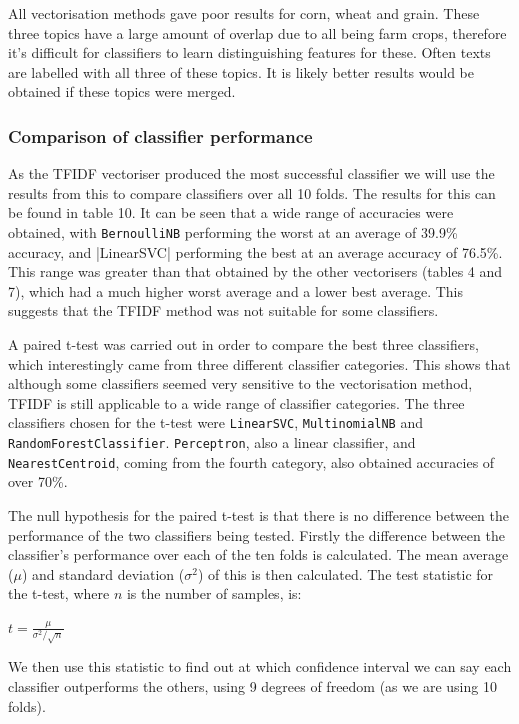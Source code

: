 \documentclass{article}
\begin{document}
All vectorisation methods gave poor results for corn, wheat and grain. These three topics have a large amount of overlap due to all being farm crops, therefore it's difficult for classifiers to learn distinguishing features for these. Often texts are labelled with all three of these topics. It is likely better results would be obtained if these topics were merged.

\subsubsection{Comparison of classifier performance}
As the TFIDF vectoriser produced the most successful classifier we will use the results from this to compare classifiers over all 10 folds. The results for this can be found in table 10. It can be seen that a wide range of accuracies were obtained, with \verb|BernoulliNB| performing the worst at an average of 39.9\% accuracy, and |LinearSVC| performing the best at an average accuracy of 76.5\%. This range was greater than that obtained by the other vectorisers (tables 4 and 7), which had a much higher worst average and a lower best average. This suggests that the TFIDF method was not suitable for some classifiers.

A paired t-test was carried out in order to compare the best three classifiers, which interestingly came from three different classifier categories. This shows that although some classifiers seemed very sensitive to the vectorisation method, TFIDF is still applicable to a wide range of classifier categories. The three classifiers chosen for the t-test were \verb|LinearSVC|, \verb|MultinomialNB| and \verb|RandomForestClassifier|. \verb|Perceptron|, also a linear classifier, and \verb|NearestCentroid|, coming from the fourth category, also obtained accuracies of over 70\%.

The null hypothesis for the paired t-test is that there is no difference between the performance of the two classifiers being tested. Firstly the difference between the classifier's performance over each of the ten folds is calculated. The mean average ($\mu$) and standard deviation ($\sigma^2$) of this is then calculated. The test statistic for the t-test, where $n$ is the number of samples, is:

\begin{center}
$t = \frac{\mu}{\sigma^2 / \sqrt{n}}$
\end{center}
We then use this statistic to find out at which confidence interval we can say each classifier outperforms the others, using 9 degrees of freedom (as we are using 10 folds).
\end{document}
